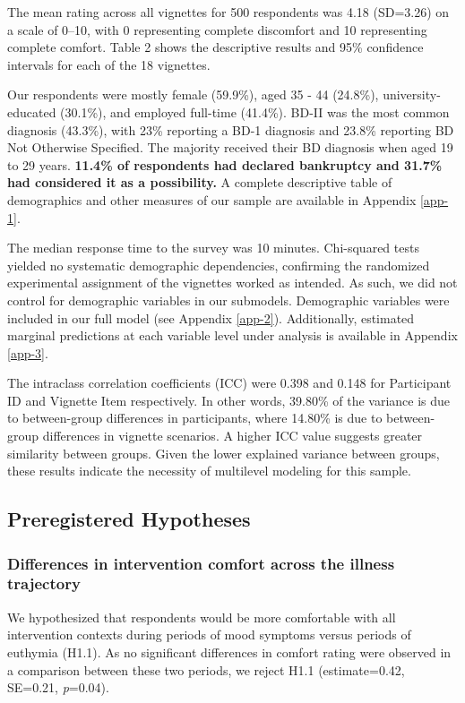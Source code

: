 \documentclass[10pt]{article}
\begin{document}
The mean rating across all vignettes for 500 respondents was 4.18 (SD=3.26) on a scale of 0--10, with 0 representing complete discomfort and 10 representing complete comfort. Table 2 shows the descriptive results and 95\% confidence intervals for each of the 18 vignettes.



Our respondents were mostly female (59.9\%), aged 35 - 44 (24.8\%), university-educated (30.1\%), and employed full-time (41.4\%). BD-II was the most common diagnosis (43.3\%), with 23\% reporting a BD-1 diagnosis and 23.8\% reporting BD Not Otherwise Specified. The majority received their BD diagnosis when aged 19 to 29 years. \textbf{11.4\% of respondents had declared bankruptcy and 31.7\% had considered it as a possibility.} A complete descriptive table of demographics and other measures of our sample are available in Appendix \ref{app-1}.

The median response time to the survey was 10 minutes. Chi-squared tests yielded no systematic demographic dependencies, confirming the randomized experimental assignment of the vignettes worked as intended. As such, we did not control for demographic variables in our submodels. Demographic variables were included in our full model (see Appendix \ref{app-2}). Additionally, estimated marginal predictions at each variable level under analysis is available in Appendix \ref{app-3}.

The intraclass correlation coefficients (ICC) were 0.398 and 0.148 for Participant ID and Vignette Item respectively. In other words, 39.80\% of the variance is due to between-group differences in participants, where 14.80\% is due to between-group differences in vignette scenarios. A higher ICC value suggests greater similarity between groups. Given the lower explained variance between groups, these results indicate the necessity of multilevel modeling for this sample.

\subsection{Preregistered Hypotheses}

\subsubsection{Differences in intervention comfort across the illness trajectory}

We hypothesized that respondents would be more comfortable with all intervention contexts during periods of mood symptoms versus periods of euthymia (H1.1). As no significant differences in comfort rating were observed in a comparison between these two periods, we reject H1.1 (estimate=0.42, SE=0.21, \emph{p}=0.04).
\end{document}
